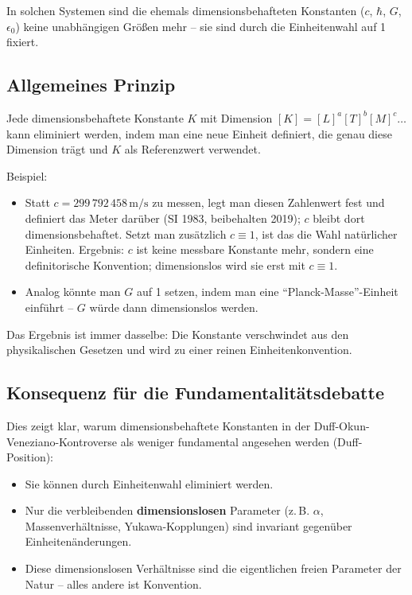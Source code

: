 In solchen Systemen sind die ehemals dimensionsbehafteten Konstanten ($c$, $\hbar$, $G$, $\epsilon_0$) keine unabhängigen Größen mehr – sie sind durch die Einheitenwahl auf 1 fixiert.

\subsection{Allgemeines Prinzip}

Jede dimensionsbehaftete Konstante $K$ mit Dimension $[K] = [L]^a [T]^b [M]^c \dots$ kann eliminiert werden, indem man eine neue Einheit definiert, die genau diese Dimension trägt und $K$ als Referenzwert verwendet.

Beispiel:
\begin{itemize}
	\item Statt $c = 299\,792\,458\,\text{m/s}$ zu messen, legt man diesen Zahlenwert fest und definiert das Meter darüber (SI 1983, beibehalten 2019); $c$ bleibt dort dimensionsbehaftet. Setzt man zusätzlich $c \equiv 1$, ist das die Wahl natürlicher Einheiten.  
	Ergebnis: $c$ ist keine messbare Konstante mehr, sondern eine definitorische Konvention; dimensionslos wird sie erst mit $c \equiv 1$.
	\item Analog könnte man $G$ auf 1 setzen, indem man eine ``Planck-Masse''-Einheit einführt – $G$ würde dann dimensionslos werden.
\end{itemize}

Das Ergebnis ist immer dasselbe: Die Konstante verschwindet aus den physikalischen Gesetzen und wird zu einer reinen Einheitenkonvention.

\subsection{Konsequenz für die Fundamentalitätsdebatte}

Dies zeigt klar, warum dimensionsbehaftete Konstanten in der Duff-Okun-Veneziano-Kontroverse als weniger fundamental angesehen werden (Duff-Position):
\begin{itemize}
	\item Sie können durch Einheitenwahl eliminiert werden.
	\item Nur die verbleibenden \textbf{dimensionslosen} Parameter (z.\,B. $\alpha$, Massenverhältnisse, Yukawa-Kopplungen) sind invariant gegenüber Einheitenänderungen.
	\item Diese dimensionslosen Verhältnisse sind die eigentlichen freien Parameter der Natur – alles andere ist Konvention.
\end{itemize}

